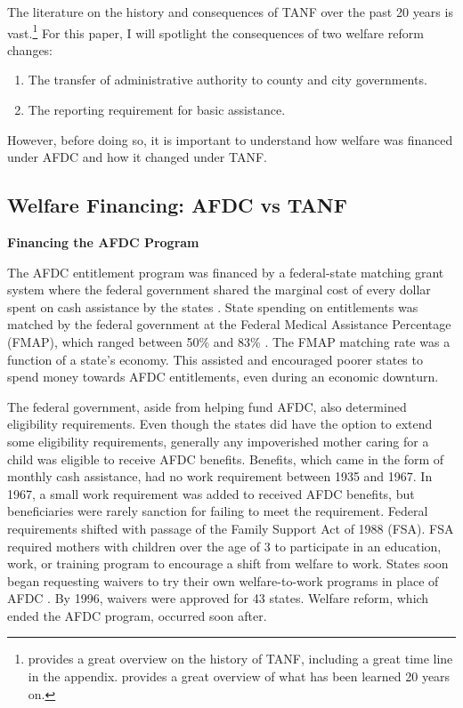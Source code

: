 \documentclass[12pt,letterpaperpaper,]{book}
\providecommand{\tightlist}{%
  \setlength{\itemsep}{0pt}\setlength{\parskip}{0pt}}
\begin{document}
The literature on the history and consequences of TANF over the past 20
years is vast.\footnote{\citet{ziliak_temporary_2015} provides a great
  overview on the history of TANF, including a great time line in the
  appendix. \citet{blank_what_2007} provides a great overview of what
  has been learned 20 years on.} For this paper, I will spotlight the
consequences of two welfare reform changes:

\begin{enumerate}
\def\labelenumi{\arabic{enumi}.}
\tightlist
\item
  The transfer of administrative authority to county and city
  governments.
\item
  The reporting requirement for basic assistance.
\end{enumerate}

However, before doing so, it is important to understand how welfare was
financed under AFDC and how it changed under TANF.

\subsection*{Welfare Financing: AFDC vs
TANF}\label{welfare-financing-afdc-vs-tanf}

\textbf{Financing the AFDC Program}

The AFDC entitlement program was financed by a federal-state matching
grant system where the federal government shared the marginal cost of
every dollar spent on cash assistance by the states
\citep{ziliak_temporary_2015}. State spending on entitlements was
matched by the federal government at the Federal Medical Assistance
Percentage (FMAP), which ranged between 50\% and 83\%
\citep{falk_temporary_2016}. The FMAP matching rate was a function of a
state's economy. This assisted and encouraged poorer states to spend
money towards AFDC entitlements, even during an economic downturn.

The federal government, aside from helping fund AFDC, also determined
eligibility requirements. Even though the states did have the option to
extend some eligibility requirements, generally any impoverished mother
caring for a child was eligible to receive AFDC benefits. Benefits,
which came in the form of monthly cash assistance, had no work
requirement between 1935 and 1967. In 1967, a small work requirement was
added to received AFDC benefits, but beneficiaries were rarely sanction
for failing to meet the requirement. Federal requirements shifted with
passage of the Family Support Act of 1988 (FSA). FSA required mothers
with children over the age of 3 to participate in an education, work, or
training program to encourage a shift from welfare to work. States soon
began requesting waivers to try their own welfare-to-work programs in
place of AFDC \citep{blank_what_2007}. By 1996, waivers were approved
for 43 states. Welfare reform, which ended the AFDC program, occurred
soon after.
\end{document}
